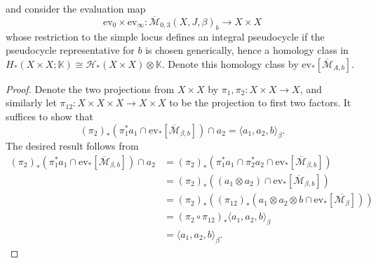 \documentclass[reqno]{amsart}
\numberwithin{equation}{section}
\numberwithin{equation}{section}
\numberwithin{equation}{section}
\newtheorem{lemma}[thm]{Lemma}
\theoremstyle{definition}
\theoremstyle{remark}
\theoremstyle{remark}
\newcommand{\ov}{\overline}
\begin{document}
and consider the evaluation map
\begin{equation}
      \mathrm{ev}_0 \times \mathrm{ev}_\infty: {\overline{\mathcal{M}}_{0,3}(X, J, \beta)_b}  \to X \times X
\end{equation}
whose restriction to the simple locus defines an integral pseudocycle if the pseudocycle representative for $b$ is chosen generically, hence a homology class in $H_*(X \times X ; \mathbb{K}) \cong \mathcal{H}_*(X\times X) \otimes \mathbb{K}$. Denote this homology class by $\mathrm{ev}_*[\ov{\mathcal{M}}_{A,b}]$.

\begin{proof}
    Denote the two projections from $X\times X$ by $\pi_1, \pi_2 : X\times X \to X$, and similarly let $\pi_{12} : X\times X \times X \to X\times X$ to be the projection to first two factors. It suffices to show that
    \begin{equation}
        (\pi_2)_* \left( \pi_1^* a_1 \cap \mathrm{ev}_*[\ov{\mathcal{M}}_{\beta,b}] \right) \cap a_2 = \langle a_1, a_2, b \rangle_\beta.
    \end{equation}
    The desired result follows from 
    \begin{align}
        (\pi_2)_* \left( \pi_1^* a_1 \cap \mathrm{ev}_*[\ov{\mathcal{M}}_{\beta,b}] \right) \cap a_2 &= (\pi_2)_* \left( \pi_1^* a_1 \cap \pi_2^* a_2 \cap \mathrm{ev}_*[\ov{\mathcal{M}}_{\beta,b}] \right) \\
        &= (\pi_2)_* \left( (a_1 \otimes a_2) \cap \mathrm{ev}_*[\ov{\mathcal{M}}_{\beta,b}] \right) \\
        &= (\pi_2)_* \left((\pi_{12})_* (a_1 \otimes a_2 \otimes b \cap \mathrm{ev}_*[\ov{\mathcal{M}_\beta}])  \right) \\
        &= (\pi_{2} \circ \pi_{12})_* \langle a_1, a_2, b \rangle_\beta \\ &= 
        \langle a_1, a_2, b \rangle_\beta  .
    \end{align}
\end{proof}


\end{document}
